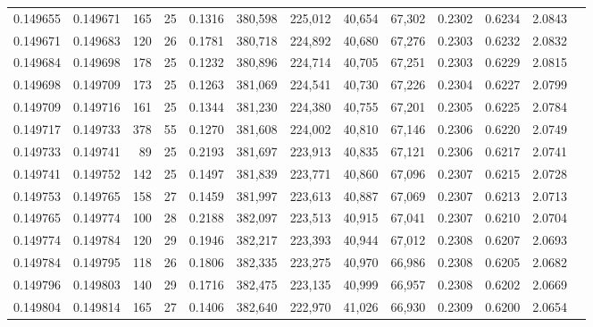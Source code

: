 \begin{tabular}{rrrrrrrrrrrrr}
0.149655 & 0.149671 & 165 &  25 &                                     0.1316 & 380,598 & 225,012 &  40,654 &  67,302 & 0.2302 & 0.6234 & 2.0843 \\
0.149671 & 0.149683 & 120 &  26 &                                     0.1781 & 380,718 & 224,892 &  40,680 &  67,276 & 0.2303 & 0.6232 & 2.0832 \\
0.149684 & 0.149698 & 178 &  25 &                                     0.1232 & 380,896 & 224,714 &  40,705 &  67,251 & 0.2303 & 0.6229 & 2.0815 \\
0.149698 & 0.149709 & 173 &  25 &                                     0.1263 & 381,069 & 224,541 &  40,730 &  67,226 & 0.2304 & 0.6227 & 2.0799 \\
0.149709 & 0.149716 & 161 &  25 &                                     0.1344 & 381,230 & 224,380 &  40,755 &  67,201 & 0.2305 & 0.6225 & 2.0784 \\
0.149717 & 0.149733 & 378 &  55 &                                     0.1270 & 381,608 & 224,002 &  40,810 &  67,146 & 0.2306 & 0.6220 & 2.0749 \\
0.149733 & 0.149741 &  89 &  25 &                                     0.2193 & 381,697 & 223,913 &  40,835 &  67,121 & 0.2306 & 0.6217 & 2.0741 \\
0.149741 & 0.149752 & 142 &  25 &                                     0.1497 & 381,839 & 223,771 &  40,860 &  67,096 & 0.2307 & 0.6215 & 2.0728 \\
0.149753 & 0.149765 & 158 &  27 &                                     0.1459 & 381,997 & 223,613 &  40,887 &  67,069 & 0.2307 & 0.6213 & 2.0713 \\
0.149765 & 0.149774 & 100 &  28 &                                     0.2188 & 382,097 & 223,513 &  40,915 &  67,041 & 0.2307 & 0.6210 & 2.0704 \\
0.149774 & 0.149784 & 120 &  29 &                                     0.1946 & 382,217 & 223,393 &  40,944 &  67,012 & 0.2308 & 0.6207 & 2.0693 \\
0.149784 & 0.149795 & 118 &  26 &                                     0.1806 & 382,335 & 223,275 &  40,970 &  66,986 & 0.2308 & 0.6205 & 2.0682 \\
0.149796 & 0.149803 & 140 &  29 &                                     0.1716 & 382,475 & 223,135 &  40,999 &  66,957 & 0.2308 & 0.6202 & 2.0669 \\
0.149804 & 0.149814 & 165 &  27 &                                     0.1406 & 382,640 & 222,970 &  41,026 &  66,930 & 0.2309 & 0.6200 & 2.0654 \\

\end{tabular}
